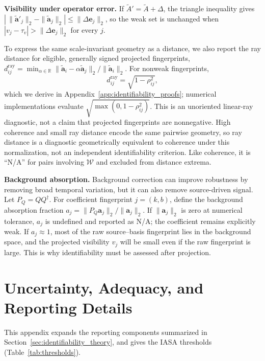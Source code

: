 \noindent\textbf{Visibility under operator error.}  If
\(\widetilde A'=\widetilde A+\Delta\), the triangle inequality gives
\(|\,\|\widetilde{\mathbf a}'_j\|_2-\|\widetilde{\mathbf a}_j\|_2|\le\|\Delta\mathbf e_j\|_2\),
so the weak set is unchanged when \(|v_j-\tau_v|>\|\Delta\mathbf e_j\|_2\) for every \(j\).

To express the same scale-invariant geometry as a distance, we also report the
ray distance for eligible, generally signed projected fingerprints,
\(d^{\mathrm{ray}}_{ij}
=\min_{\alpha\in\mathbb R}
\|\widetilde{\mathbf a}_i-\alpha\widetilde{\mathbf a}_j\|_2/
\|\widetilde{\mathbf a}_i\|_2\).
For nonweak fingerprints,
\begin{equation}
d^{\mathrm{ray}}_{ij}=\sqrt{1-\rho_{ij}^2},
\label{eq:ray_distance_coherence_relation}
\end{equation}
which we derive in Appendix~\ref{app:identifiability_proofs}; numerical
implementations evaluate \(\sqrt{\max(0,1-\rho_{ij}^2)}\).  This is an unoriented
linear-ray diagnostic, not a claim that projected fingerprints are nonnegative.
High coherence and small ray distance encode the same pairwise geometry, so ray
distance is a diagnostic geometrically equivalent to coherence under this
normalization, not an independent identifiability criterion.  Like coherence, it
is ``N/A'' for pairs involving \(\mathcal W\) and excluded from distance extrema.

\noindent\textbf{Background absorption.}
Background correction can improve robustness by removing broad temporal
variation, but it can also remove source-driven signal.  Let \(P_Q=QQ^\dagger\).
For coefficient fingerprint \(j=(k,b)\), define the background absorption
fraction \(a_j=\|P_Q\mathbf a_j\|_2/\|\mathbf a_j\|_2\).
If \(\|\mathbf a_j\|_2\) is zero at numerical tolerance,
\(a_j\) is undefined and reported as N/A; the coefficient remains explicitly
weak.
If \(a_j\approx 1\), most of the raw source--basis fingerprint lies in the
background space, and the projected visibility \(v_j\) will be small even if
the raw fingerprint is large.  This is why identifiability must be assessed
after projection.


\section{Uncertainty, Adequacy, and Reporting Details}
\label{app:reporting_details}

This appendix expands the reporting components summarized in
Section~\ref{sec:identifiability_theory}, and gives the IASA thresholds
(Table~\ref{tab:thresholds}).

